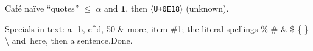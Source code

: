 Caf\'e {\textemdash} na\"ive {\textquotedblleft}quotes{\textquotedblright} {\textonehalf} \ensuremath{\leq} \ensuremath{\alpha} and \ensuremath{\mathbf{1}}, then \ensuremath{\langle}\texttt{U+0E18}\ensuremath{\rangle} (unknown).

Specials in text: a\_b, c\textasciicircum{}d, 50 \& more, item \#1; the literal spellings
\% \# \& \$ \{ \} \textbackslash{} and~here, then a sentence.\@ Done.
